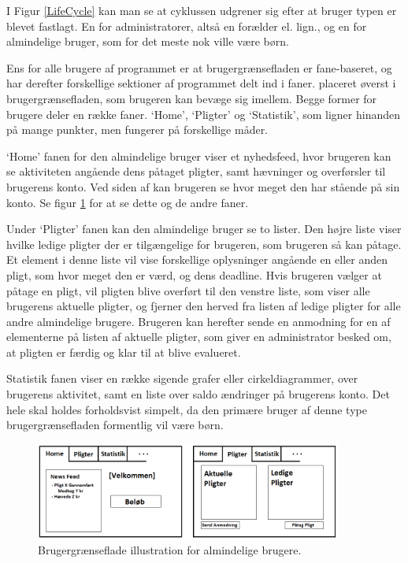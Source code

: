 I Figur \ref{LifeCycle} kan man se at cyklussen udgrener sig efter at bruger typen er blevet fastlagt. En for administratorer, altså en forælder el. lign., og en for almindelige bruger, som for det meste nok ville være børn.

Ens for alle brugere af programmet er at brugergrænsefladen er fane-baseret, og har derefter forskellige sektioner af programmet delt ind i faner. placeret øverst i brugergrænsefladen, som brugeren kan bevæge sig imellem. Begge former for brugere deler en række faner. ‘Home’, ‘Pligter’ og ‘Statistik’, som ligner hinanden på mange punkter, men fungerer på forskellige måder.

‘Home’ fanen for den almindelige bruger viser et nyhedsfeed, hvor brugeren kan se aktiviteten angående dens påtaget pligter, samt hævninger og overførsler til brugerens konto. Ved siden af kan brugeren se hvor meget den har stående på sin konto. Se figur \ref{BarnUI} for at se dette og de andre faner.

Under ‘Pligter’ fanen kan den almindelige bruger se to lister. Den højre liste viser hvilke ledige pligter der er tilgængelige for brugeren, som brugeren så kan påtage. Et element i denne liste vil vise forskellige oplysninger angående en eller anden pligt, som hvor meget den er værd, og dens deadline. Hvis brugeren vælger at påtage en pligt, vil pligten blive overført til den venstre liste, som viser alle brugerens aktuelle pligter, og fjerner den herved fra listen af ledige pligter for alle andre almindelige brugere. Brugeren kan herefter sende en anmodning for en af elementerne på listen af aktuelle pligter, som giver en administrator besked om, at pligten er færdig og klar til at blive evalueret.

Statistik fanen viser en række sigende grafer eller cirkeldiagrammer, over brugerens aktivitet, samt en liste over saldo ændringer på brugerens konto. Det hele skal holdes forholdsvist simpelt, da den primære bruger af denne type brugergrænsefladen formentlig vil være børn.

\begin{figure}[H]
\centering
\includegraphics[width=0.9\textwidth]{Billeder/BarnUI.png}
\caption{Brugergrænseflade illustration for almindelige brugere.}
\label{BarnUI}
\end{figure}
